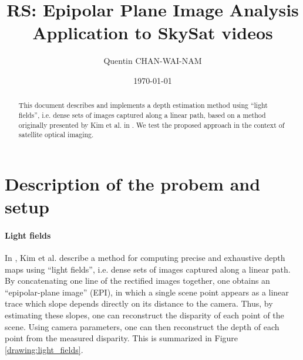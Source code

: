\documentclass{article}
\title{RS: Epipolar Plane Image Analysis\\Application to SkySat videos}
\date{\today}
\author{Quentin CHAN-WAI-NAM}
\theoremstyle{definition}
\begin{document}
\maketitle


\begin{abstract}
This document describes and implements a depth estimation method using ``light fields'', i.e. dense sets of images captured along a linear path, based on a method originally presented by Kim et al. in \cite{art:kim13:lfields}. We test the proposed approach in the context of satellite optical imaging.
\end{abstract}


\tableofcontents

\clearpage
\section{Description of the probem and setup}



\paragraph{Light fields} In \cite{art:kim13:lfields}, Kim et al. describe a method for computing precise and exhaustive depth maps using ``light fields'', i.e. dense sets of images captured along a linear path. By concatenating one line of the rectified images together, one obtains an ``epipolar-plane image'' (EPI), in which a single scene point appears as a linear trace which slope depends directly on its distance to the camera. Thus, by estimating these slopes, one can reconstruct the disparity of each point of the scene. Using camera parameters, one can then reconstruct the depth of each point from the measured disparity. This is summarized in Figure \ref{drawing:light_fields}.
\end{document}
